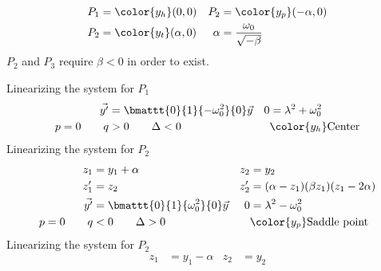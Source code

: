 \begin{enumerate}
\begin{enumerate}
\begin{align}
                        P_1                                & = \color{y_h}(0, 0) &
                        P_2                                & = \color{y_p}
                        (-\alpha, 0)                                               \\
                        P_2                                & = \color{y_t}
                        (\alpha, 0)                        &
                        \alpha                             &
                        = \frac{\omega_0}{\sqrt{-\beta}}
                    \end{align}
                    $ P_2 $ and $ P_3 $ require $ \beta < 0 $ in order to exist. \par
                    Linearizing the system for $ P_1 $
                    \begin{align}
                        \vec{y'}       & = \bmattt{0}{1}{-\omega_0^{2}}{0} \vec{y} &
                        0              & = \lambda^{2} + \omega_0^{2}                \\
                        p = 0 \qquad q & > 0 \qquad \Delta < 0                     &
                                       & \color{y_h} \text{Center}
                    \end{align}
                    Linearizing the system for $ P_2 $
                    \begin{align}
                        z_1            & = y_1 + \alpha                             &
                        z_2            & = y_2                                        \\
                        z_1'           & = z_2                                      &
                        z_2'           & = (\alpha - z_1)(\beta z_1)(z_1 - 2\alpha)   \\
                        \vec{y'}       & = \bmattt{0}{1}{\omega_0^{2}}{0} \vec{y}   &
                        0              & = \lambda^{2} - \omega_0^{2}                 \\
                        p = 0 \qquad q & < 0 \qquad \Delta > 0                      &
                                       & \color{y_p} \text{Saddle point}
                    \end{align}
                    Linearizing the system for $ P_2 $
                    \begin{align}
                        z_1            & = y_1 - \alpha                              &
                        z_2            & = y_2                                         \\

\end{align}
\end{enumerate}
\end{enumerate}
